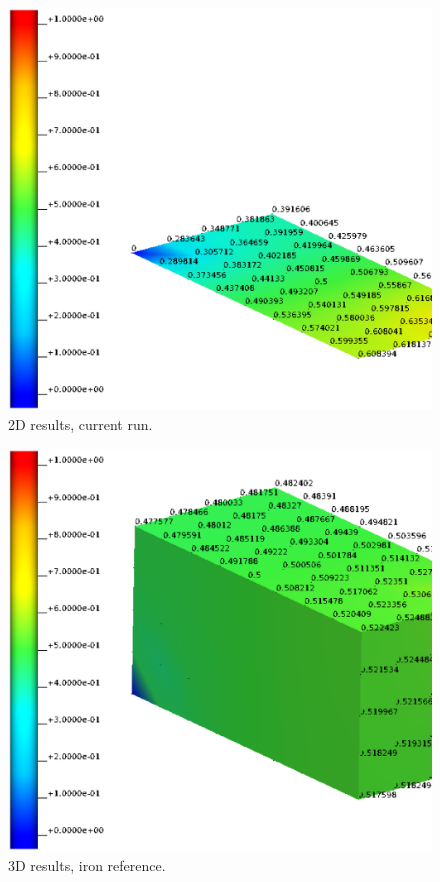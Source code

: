 \begin{figure}[h!]
    \centering 
    \includegraphics[width=0.9\columnwidth]{examples/example-0001/doc/figures/current_run_l2x1x0_n8x4x0_i1_s0.eps} 
    \caption{2D results, current run.}
    \label{example-0001-current-run-2D-fig}
\end{figure}
%
\begin{figure}[h!]
    \centering 
    \includegraphics[width=0.9\columnwidth]{examples/example-0001/doc/figures/iron_reference_3D.eps} 
    \caption{3D results, iron reference.}
    \label{example-0001-iron-3D-reference-fig}
\end{figure}
